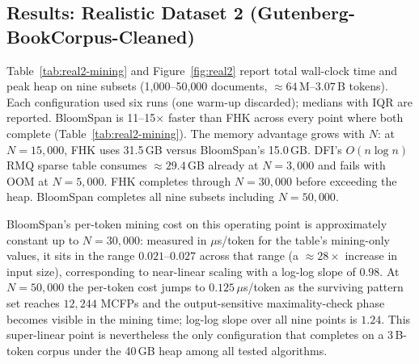 \documentclass[runningheads]{llncs}
\begin{document}
    \subsection{Results: Realistic Dataset 2 (Gutenberg-BookCorpus-Cleaned)}\label{sec:results-large}

    Table~\ref{tab:real2-mining} and Figure~\ref{fig:real2} report total wall-clock time and peak heap on nine subsets (1{,}000--50{,}000 documents, $\approx 64$\,M--$3.07$\,B tokens). Each configuration used six runs (one warm-up discarded); medians with IQR are reported.  BloomSpan is 11--15$\times$ faster than FHK across every point where both complete (Table~\ref{tab:real2-mining}). The memory advantage grows with $N$: at $N = 15{,}000$, FHK uses 31.5\,GB versus BloomSpan's 15.0\,GB. DFI's $O(n \log n)$ RMQ sparse table consumes $\approx 29.4$\,GB already at $N = 3{,}000$ and fails with OOM at
    $N = 5{,}000$. FHK completes through $N = 30{,}000$ before exceeding the heap. BloomSpan completes all nine subsets including $N = 50{,}000$.

    BloomSpan's per-token mining cost on this operating point is approximately constant up to $N = 30{,}000$: measured in $\mu$s/token  for the table's mining-only values, it sits in the range $0.021$--$0.027$ across that range (a $\approx 28 \times$ increase in input size), corresponding to near-linear scaling with a log-log slope of $0.98$. At $N = 50{,}000$ the per-token cost jumps to  $0.125\,\mu$s/token as the surviving pattern set reaches     $12{,}244$ MCFPs and the output-sensitive maximality-check phase becomes visible in the mining time; log-log slope over all nine points is $1.24$. This super-linear point is nevertheless the only configuration that completes on a 3\,B-token corpus under the 40\,GB heap among all tested algorithms.
\end{document}
